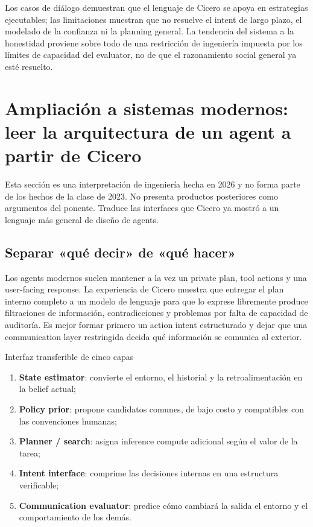 \documentclass[a4paper]{article}
\begin{document}
Los casos de diálogo demuestran que el lenguaje de Cicero se apoya en estrategias ejecutables; las limitaciones muestran que no resuelve el intent de largo plazo, el modelado de la confianza ni la planning general. La tendencia del sistema a la honestidad proviene sobre todo de una restricción de ingeniería impuesta por los límites de capacidad del evaluator, no de que el razonamiento social general ya esté resuelto.
\section{Ampliación a sistemas modernos: leer la arquitectura de un agent a partir de Cicero}

Esta sección es una interpretación de ingeniería hecha en 2026 y no forma parte de los hechos de la clase de 2023. No presenta productos posteriores como argumentos del ponente. Traduce las interfaces que Cicero ya mostró a un lenguaje más general de diseño de agents.

\subsection{Separar «qué decir» de «qué hacer»}

Los agents modernos suelen mantener a la vez un private plan, tool actions y una user-facing response. La experiencia de Cicero muestra que entregar el plan interno completo a un modelo de lenguaje para que lo exprese libremente produce filtraciones de información, contradicciones y problemas por falta de capacidad de auditoría. Es mejor formar primero un action intent estructurado y dejar que una communication layer restringida decida qué información se comunica al exterior.

\begin{knowledgebox}{Interfaz transferible de cinco capas}
\begin{enumerate}
  \item \textbf{State estimator}: convierte el entorno, el historial y la retroalimentación en la belief actual;
  \item \textbf{Policy prior}: propone candidatos comunes, de bajo costo y compatibles con las convenciones humanas;
  \item \textbf{Planner / search}: asigna inference compute adicional según el valor de la tarea;
  \item \textbf{Intent interface}: comprime las decisiones internas en una estructura verificable;
  \item \textbf{Communication evaluator}: predice cómo cambiará la salida el entorno y el comportamiento de los demás.
\end{enumerate}
\end{knowledgebox}
\end{document}
